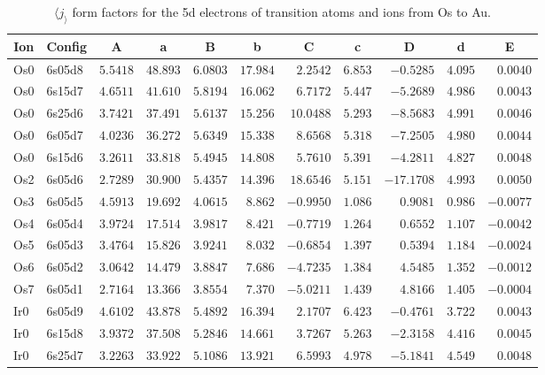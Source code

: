 \begin{table}[H]
 \caption{$\langle j_\rangle$ form factors for the 5d electrons of transition atoms and ions from Os to Au.\cite{kob:11}}
\label{5dj2b} \vspace{1ex}
{\tablesize
\begin{tabular}{llrrrrrrrrr}
\hline
\multicolumn{1}{c}{ Ion}&\multicolumn{1}{c}{ Config}&\multicolumn{1}{c}{ A }&\multicolumn{1}{c}{  a }&\multicolumn{1}{c}{B }&\multicolumn{1}{c}{ b }&\multicolumn{1}{c}{ C }&\multicolumn{1}{c}{ c }&\multicolumn{1}{c}{ D }&\multicolumn{1}{c}{ d }&\multicolumn{1}{c}{E }\\
\hline
Os0 & 6s05d8 &$5.5418$ &$48.893$ &$6.0803$ &$17.984$ &$2.2542$ &$6.853$ &$-0.5285$ &$4.095$ &$0.0040$ \\
Os0 & 6s15d7 &$4.6511$ &$41.610$ &$5.8194$ &$16.062$ &$6.7172$ &$5.447$ &$-5.2689$ &$4.986$ &$0.0043$ \\
Os0 & 6s25d6 &$3.7421$ &$37.491$ &$5.6137$ &$15.256$ &$10.0488$ &$5.293$ &$-8.5683$ &$4.991$ &$0.0046$ \\
Os0 & 6s05d7 &$4.0236$ &$36.272$ &$5.6349$ &$15.338$ &$8.6568$ &$5.318$ &$-7.2505$ &$4.980$ &$0.0044$ \\
Os0 & 6s15d6 &$3.2611$ &$33.818$ &$5.4945$ &$14.808$ &$5.7610$ &$5.391$ &$-4.2811$ &$4.827$ &$0.0048$ \\
Os2 & 6s05d6 &$2.7289$ &$30.900$ &$5.4357$ &$14.396$ &$18.6546$ &$5.151$ &$-17.1708$ &$4.993$ &$0.0050$ \\
Os3 & 6s05d5 &$4.5913$ &$19.692$ &$4.0615$ &$8.862$ &$-0.9950$ &$1.086$ &$0.9081$ &$0.986$ &$-0.0077$ \\
Os4 & 6s05d4 &$3.9724$ &$17.514$ &$3.9817$ &$8.421$ &$-0.7719$ &$1.264$ &$0.6552$ &$1.107$ &$-0.0042$ \\
Os5 & 6s05d3 &$3.4764$ &$15.826$ &$3.9241$ &$8.032$ &$-0.6854$ &$1.397$ &$0.5394$ &$1.184$ &$-0.0024$ \\
Os6 & 6s05d2 &$3.0642$ &$14.479$ &$3.8847$ &$7.686$ &$-4.7235$ &$1.384$ &$4.5485$ &$1.352$ &$-0.0012$ \\
Os7 & 6s05d1 &$2.7164$ &$13.366$ &$3.8554$ &$7.370$ &$-5.0211$ &$1.439$ &$4.8166$ &$1.405$ &$-0.0004$ \\
Ir0 & 6s05d9 &$4.6102$ &$43.878$ &$5.4892$ &$16.394$ &$2.1707$ &$6.423$ &$-0.4761$ &$3.722$ &$0.0043$ \\
Ir0 & 6s15d8 &$3.9372$ &$37.508$ &$5.2846$ &$14.661$ &$3.7267$ &$5.263$ &$-2.3158$ &$4.416$ &$0.0045$ \\
Ir0 & 6s25d7 &$3.2263$ &$33.922$ &$5.1086$ &$13.921$ &$6.5993$ &$4.978$ &$-5.1841$ &$4.549$ &$0.0048$ \\

\end{tabular}}
\end{table}
